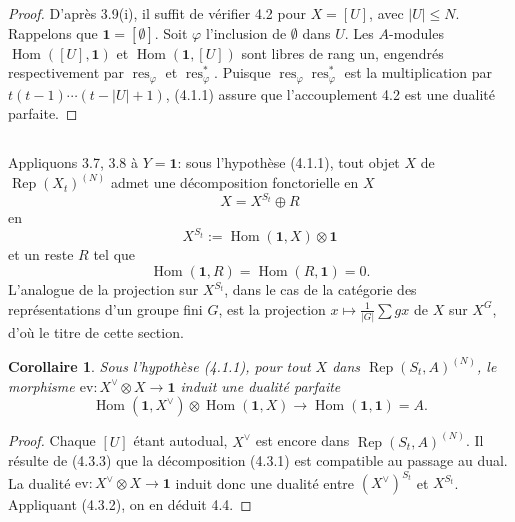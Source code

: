\documentclass[11pt,a4paper]{article}
\theoremstyle{plain}
\newtheorem{corollary}[theorem]{Corollaire}
\theoremstyle{definition}
\DeclareMathOperator{\Hom}{Hom}
\DeclareMathOperator{\Rep}{Rep}
\DeclareMathOperator{\res}{res}
\newcommand{\ev}{\mathrm{ev}}
\begin{document}
\begin{proof}
D'apr\`es 3.9(i), il suffit de v\'erifier 4.2 pour $X = [U]$, avec $|U| \leq N$. Rappelons que $\mathbf{1} = [\emptyset]$. Soit $\varphi$ l'inclusion de $\emptyset$ dans $U$. Les $A$-modules $\Hom([U], \mathbf{1})$ et $\Hom(\mathbf{1}, [U])$ sont libres de rang un, engendr\'es respectivement par $\res_\varphi$ et $\res^*_\varphi$. Puisque $\res_\varphi \res^*_\varphi$ est la multiplication par $t(t-1)\cdots(t-|U|+1)$, (4.1.1) assure que l'accouplement 4.2 est une dualit\'e parfaite.
\end{proof}

\subsection{}
Appliquons 3.7, 3.8 \`a $Y = \mathbf{1}$: sous l'hypoth\`ese (4.1.1), tout objet $X$ de $\Rep(X_t)^{(N)}$ admet une d\'ecomposition fonctorielle en $X$
\begin{equation}
X = X^{S_t} \oplus R \tag{4.3.1}
\end{equation}
en
\begin{equation}
X^{S_t} := \Hom(\mathbf{1}, X) \otimes \mathbf{1} \tag{4.3.2}
\end{equation}
et un reste $R$ tel que
\begin{equation}
\Hom(\mathbf{1}, R) = \Hom(R, \mathbf{1}) = 0. \tag{4.3.3}
\end{equation}
L'analogue de la projection sur $X^{S_t}$, dans le cas de la cat\'egorie des repr\'esentations d'un groupe fini $G$, est la projection $x \mapsto \frac{1}{|G|} \sum gx$ de $X$ sur $X^G$, d'o\`u le titre de cette section.

\begin{corollary}
Sous l'hypoth\`ese (4.1.1), pour tout $X$ dans $\Rep(S_t, A)^{(N)}$, le morphisme $\ev : X^\vee \otimes X \to \mathbf{1}$ induit une dualit\'e parfaite
\[
\Hom(\mathbf{1}, X^\vee) \otimes \Hom(\mathbf{1}, X) \to \Hom(\mathbf{1}, \mathbf{1}) = A.
\]
\end{corollary}

\begin{proof}
Chaque $[U]$ \'etant autodual, $X^\vee$ est encore dans $\Rep(S_t, A)^{(N)}$. Il r\'esulte de (4.3.3) que la d\'ecomposition (4.3.1) est compatible au passage au dual. La dualit\'e $\ev : X^\vee \otimes X \to \mathbf{1}$ induit donc une dualit\'e entre $(X^\vee)^{S_t}$ et $X^{S_t}$. Appliquant (4.3.2), on en d\'eduit 4.4.
\end{proof}
\end{document}
